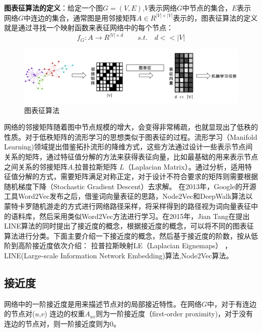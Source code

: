 \textbf{图表征算法的定义}：给定一个图$G = (V,E)$,$V$表示网络$G$中节点的集合，$E$表示网络$G$中连边的集合，通常图是用邻接矩阵$A \in R^{|V|\times|V|}$表示的，图表征算法的定义就是通过寻找一个映射函数来表征网络中的每个节点：
\begin{equation}
f_G: A \rightarrow R^{|V| \times d} \qquad s.t.\quad d<<|V|
\end{equation}

\begin{figure}
	\centering
	\includegraphics[width=5.5in]{figures/network_embedding}
	\caption{图表征算法}
\end{figure}


网络的邻接矩阵随着图中节点规模的增大，会变得非常稀疏，也就显现出了低秩的性质。对于低秩矩阵的流形学习的思想类似于图表征的过程。流形学习（Manifold Learning)领域提出借鉴拓扑流形的降维方式，这些方法通过设计一些表示节点间关系的矩阵，通过特征值分解的方法来获得表征向量，比如最基础的用来表示节点之间关系的邻接矩阵$A$,拉普拉斯矩阵 $L$（Laplacian Matrix）。通过分析，适用特征值分解的方式，需要矩阵满足对称正定，对于设计不符合要求的矩阵则需要根据随机梯度下降（Stochastic Gradient Descent）去求解。
在2013年，Google的开源工具Word2Vec\cite{mikolov2013efficient}发布之后，借鉴词向量表征的思路，Node2Vec和DeepWalk算法以蒙特卡罗随机游走的方式进行网络路径采样，将采样得到的路径视为词向量表征中的语料库，然后采用类似Word2Vec方法进行学习。在2015年，Jian Tang\cite{tang2015line}在提出LINE算法的同时提出了接近度的概念，根据接近度的概念，可以将不同的图表征算法进行分类。下面主要介绍一下接近度的概念，然后基于接近度的阶数，按从低阶到高阶接近度依次介绍：%
拉普拉斯映射LE（Laplacian Eignemaps） ， LINE(Large-scale Information Network Embedding)算法,Node2Vec算法。%
\subsection{接近度}
\label{first_order}
网络中的一阶接近度是用来描述节点对的局部接近特性。在网络$G$中，对于有连边的节点对($u$,$v$)
连边的权重$A_{uv}$则为一阶接近度（first-order proximity)，对于没有连边的节点对，则一阶接近度则为0。

